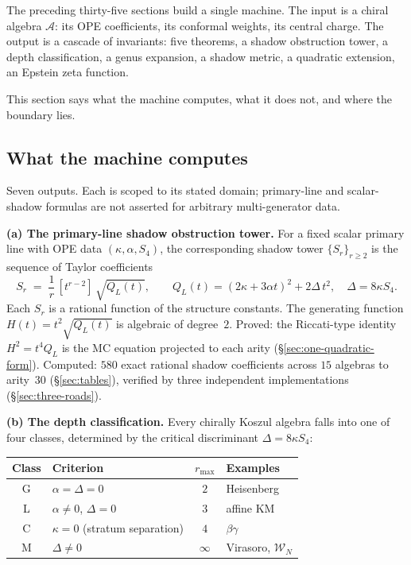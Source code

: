 \documentclass[11pt]{article}
\newcommand{\cA}{\mathcal{A}}
\newcommand{\cW}{\mathcal{W}}
\begin{document}
The preceding thirty-five sections build a single machine.  The
input is a chiral algebra $\cA$: its OPE coefficients, its
conformal weights, its central charge.  The output is a cascade
of invariants: five theorems, a shadow obstruction tower, a depth
classification, a genus expansion, a shadow metric, a quadratic
extension, an Epstein zeta function.

This section says what the machine computes, what it does not,
and where the boundary lies.

\subsection{What the machine computes}

Seven outputs.  Each is scoped to its stated domain; primary-line
and scalar-shadow formulas are not asserted for arbitrary
multi-generator data.

\medskip

\noindent\textbf{(a) The primary-line shadow obstruction tower.}\enspace
For a fixed scalar primary line with OPE data
$(\kappa, \alpha, S_4)$, the corresponding shadow tower
$\{S_r\}_{r \geq 2}$
is the sequence of Taylor coefficients
\begin{equation}\label{eq:shadow-tower-summary}
S_r \;=\; \frac{1}{r}\,[t^{r-2}]\,\sqrt{Q_L(t)},
\qquad
Q_L(t) = (2\kappa + 3\alpha t)^2 + 2\Delta\, t^2,
\quad \Delta = 8\kappa S_4.
\end{equation}
Each $S_r$ is a rational function of the structure constants.
The generating function $H(t) = t^2\sqrt{Q_L(t)}$ is algebraic
of degree~$2$.  Proved: the Riccati-type identity
$H^2 = t^4 Q_L$ is the MC equation projected to each arity
(\S\ref{sec:one-quadratic-form}).  Computed: $580$ exact
rational shadow coefficients across $15$ algebras to arity~$30$
(\S\ref{sec:tables}), verified by three independent
implementations (\S\ref{sec:three-roads}).

\medskip

\noindent\textbf{(b) The depth classification.}\enspace
Every chirally Koszul algebra falls into one of four classes,
determined by the critical discriminant $\Delta = 8\kappa S_4$:

\begin{center}
\small
\renewcommand{\arraystretch}{1.15}
\begin{tabular}{@{}clcl@{}}
\textbf{Class} & \textbf{Criterion} & $r_{\max}$ & \textbf{Examples} \\
\hline
G & $\alpha = \Delta = 0$ & $2$ & Heisenberg \\
L & $\alpha \neq 0$, $\Delta = 0$ & $3$ & affine KM \\
C & $\kappa = 0$ (stratum separation) & $4$ & $\beta\gamma$ \\
M & $\Delta \neq 0$ & $\infty$ & Virasoro, $\cW_N$
\end{tabular}
\end{center}
\end{document}
